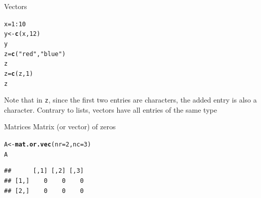 \documentclass[aspectratio=169]{beamer}\usepackage[]{graphicx}\usepackage[]{xcolor}
\makeatletter
\newcommand{\hlnum}[1]{\textcolor[rgb]{0.686,0.059,0.569}{#1}}%
\newcommand{\hlsng}[1]{\textcolor[rgb]{0.192,0.494,0.8}{#1}}%
\newcommand{\hlopt}[1]{\textcolor[rgb]{0,0,0}{#1}}%
\newcommand{\hldef}[1]{\textcolor[rgb]{0.345,0.345,0.345}{#1}}%
\newcommand{\hlkwb}[1]{\textcolor[rgb]{0.69,0.353,0.396}{#1}}%
\newcommand{\hlkwc}[1]{\textcolor[rgb]{0.333,0.667,0.333}{#1}}%
\newcommand{\hlkwd}[1]{\textcolor[rgb]{0.737,0.353,0.396}{\textbf{#1}}}%
\newenvironment{kframe}{%
 \def\at@end@of@kframe{}%
 \ifinner\ifhmode%
  \def\at@end@of@kframe{\end{minipage}}%
  \begin{minipage}{\columnwidth}%
 \fi\fi%
 \def\FrameCommand##1{\hskip\@totalleftmargin \hskip-\fboxsep
 \colorbox{shadecolor}{##1}\hskip-\fboxsep
     \hskip-\linewidth \hskip-\@totalleftmargin \hskip\columnwidth}%
 \MakeFramed {\advance\hsize-\width
   \@totalleftmargin\z@ \linewidth\hsize
   \@setminipage}}%
 {\par\unskip\endMakeFramed%
 \at@end@of@kframe}
\newenvironment{knitrout}{}{} %
\makeatother
\begin{document}
\begin{frame}[fragile]{Vectors}
\begin{knitrout}
\color{fgcolor}\begin{kframe}
\begin{alltt}
\hldef{x} \hlkwb{=} \hlnum{1}\hlopt{:}\hlnum{10}
\hldef{y} \hlkwb{<-} \hlkwd{c}\hldef{(x,} \hlnum{12}\hldef{)}
\hldef{y}
\hldef{z} \hlkwb{=} \hlkwd{c}\hldef{(}\hlsng{"red"}\hldef{,} \hlsng{"blue"}\hldef{)}
\hldef{z}
\hldef{z} \hlkwb{=} \hlkwd{c}\hldef{(z,} \hlnum{1}\hldef{)}
\hldef{z}
\end{alltt}
\end{kframe}
\end{knitrout}

Note that in \texttt{z}, since the first two entries are characters, the added entry is also a character. Contrary to lists, vectors have all entries of the same type
\end{frame}

\begin{frame}[fragile]{Matrices}
Matrix (or vector) of zeros
\begin{knitrout}
\color{fgcolor}\begin{kframe}
\begin{alltt}
\hldef{A} \hlkwb{<-} \hlkwd{mat.or.vec}\hldef{(}\hlkwc{nr} \hldef{=} \hlnum{2}\hldef{,} \hlkwc{nc} \hldef{=} \hlnum{3}\hldef{)}
\hldef{A}
\end{alltt}
\begin{verbatim}
##      [,1] [,2] [,3]
## [1,]    0    0    0
## [2,]    0    0    0
\end{verbatim}
\end{kframe}
\end{knitrout}
\end{frame}
\end{document}
